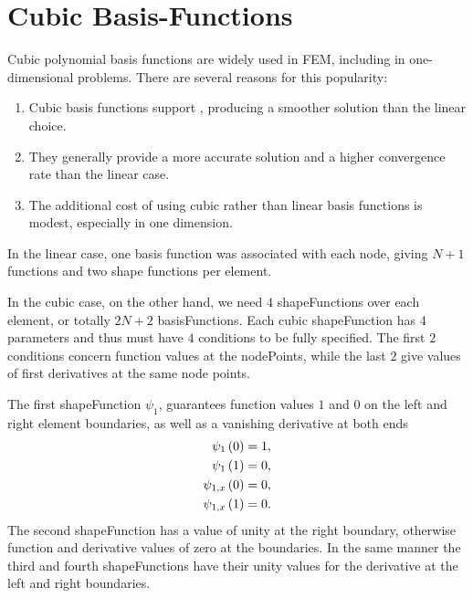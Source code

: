 \section{Cubic Basis-Functions} \label{cha:Cubic_Basis_Function}
Cubic polynomial basis functions are widely used in FEM, including in one-dimensional problems.
There are several reasons for this popularity:
\begin{enumerate}
	\item Cubic basis functions support , producing a smoother solution than the linear choice.

	\item They generally provide a more accurate solution and a higher convergence rate than the linear case.

	\item The additional cost of using cubic rather than linear basis functions is modest, especially in one dimension.
\end{enumerate}
%
In the linear case, one basis function was associated with each node, giving $N+1$ functions and two shape functions per element.

In the cubic case, on the other hand, we need $4$ \glspl{shapeFunction} over each \gls{element}, or totally $2N + 2$ \glspl{basisFunction}.
Each cubic \gls{shapeFunction} has 4 parameters and thus must have $4$ conditions to be fully specified. The first $2$ conditions
concern function values at the \glspl{nodePoint}, while the last $2$ give values of first derivatives at the same node points.

The first \gls{shapeFunction} $\psi_1$, guarantees function values $1$ and $0$ on the left and right element boundaries, as well as a
vanishing derivative at both ends
\begin{subequations}	\label{eqn:Cond_On_Cubic_Psi_1_Local}
	{\allowdisplaybreaks
		\begin{align}
			\psi_{1} \left( 0\right) &= 1,	\\
			\psi_{1} \left( 1 \right) &= 0,	\\
			\psi_{1,  x}\left( 0 \right) &= 0,	\\
			\psi_{1,  x}\left( 1 \right) &= 0.
		\end{align}
	}%
\end{subequations}
The second \gls{shapeFunction} has a value of unity at the right boundary, otherwise function and derivative values of zero at the boundaries.
In the same manner the third and fourth \glspl{shapeFunction} have their unity values for the derivative at the left and right boundaries.

